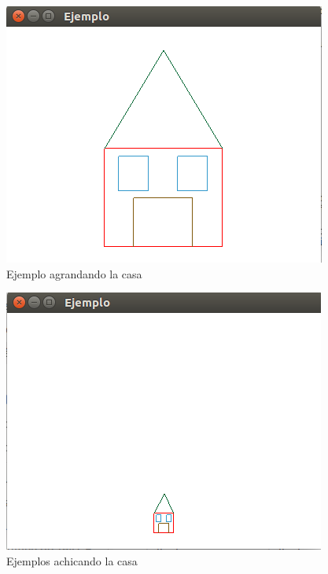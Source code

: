\documentclass[a4paper,12pt]{article}
\begin{document}
\begin{enumerate}
 \begin{figure}[H]
  \centering
  \includegraphics[scale = 0.5]{7.png}
  \caption{Ejemplo agrandando la casa}
 \end{figure}
 \begin{figure}[H]
  \centering
  \includegraphics[scale = 0.5]{8.png}
  \caption{Ejemplos achicando la casa}
 \end{figure}
 
 
 
\end{enumerate}
\end{document}
